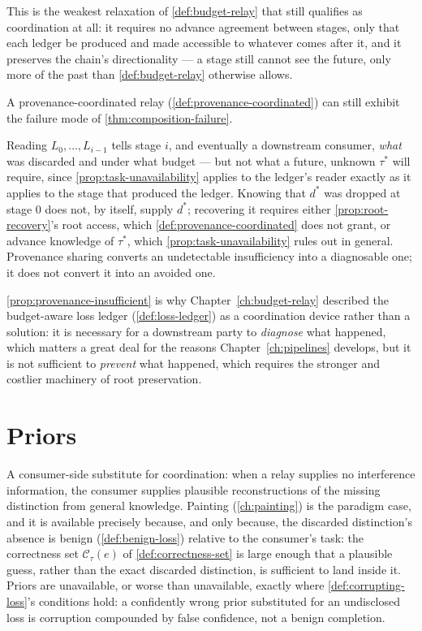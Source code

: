 This is the weakest relaxation of \cref{def:budget-relay} that still
qualifies as coordination at all: it requires no advance agreement
between stages, only that each ledger be produced and made accessible to
whatever comes after it, and it preserves the chain's directionality ---
a stage still cannot see the future, only more of the past than
\cref{def:budget-relay} otherwise allows.

\begin{proposition}
\label{prop:provenance-insufficient}
A provenance-coordinated relay (\cref{def:provenance-coordinated}) can
still exhibit the failure mode of \cref{thm:composition-failure}.
\end{proposition}

\begin{proofsketch}
Reading $L_0, \ldots, L_{i-1}$ tells stage $i$, and eventually a
downstream consumer, \emph{what} was discarded and under what budget ---
but not what a future, unknown $\tau^*$ will require, since
\cref{prop:task-unavailability} applies to the ledger's reader exactly as
it applies to the stage that produced the ledger. Knowing that $d^*$ was
dropped at stage $0$ does not, by itself, supply $d^*$; recovering it
requires either \cref{prop:root-recovery}'s root access, which
\cref{def:provenance-coordinated} does not grant, or advance knowledge of
$\tau^*$, which \cref{prop:task-unavailability} rules out in general.
Provenance sharing converts an undetectable insufficiency into a
diagnosable one; it does not convert it into an avoided one.
\end{proofsketch}

\cref{prop:provenance-insufficient} is why Chapter~\ref{ch:budget-relay}
described the budget-aware loss ledger (\cref{def:loss-ledger}) as a
coordination device rather than a solution: it is necessary for a
downstream party to \emph{diagnose} what happened, which matters a great
deal for the reasons Chapter~\ref{ch:pipelines} develops, but it is not
sufficient to \emph{prevent} what happened, which requires the stronger
and costlier machinery of root preservation.

\section{Priors}
\label{sec:coord-priors}

A consumer-side substitute for coordination: when a relay supplies no
interference information, the consumer supplies plausible reconstructions
of the missing distinction from general knowledge. Painting
(\cref{ch:painting}) is the paradigm case, and it is available precisely
because, and only because, the discarded distinction's absence is benign
(\cref{def:benign-loss}) relative to the consumer's task: the correctness
set $\mathcal{C}_\tau(e)$ of \cref{def:correctness-set} is large enough
that a plausible guess, rather than the exact discarded distinction, is
sufficient to land inside it. Priors are unavailable, or worse than
unavailable, exactly where \cref{def:corrupting-loss}'s conditions hold:
a confidently wrong prior substituted for an undisclosed loss is
corruption compounded by false confidence, not a benign completion.

